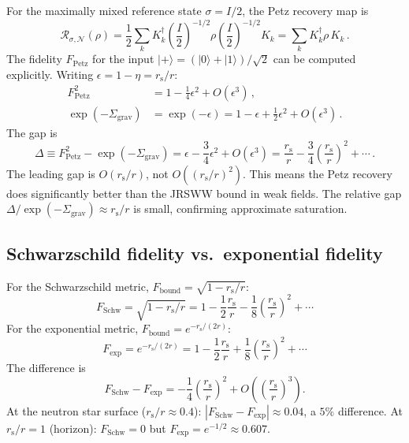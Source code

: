 \documentclass[aps,prd,preprint,superscriptaddress,longbibliography]{revtex4-2}
\newcommand{\Petz}{\mathcal{R}}
\newcommand{\chan}{\mathcal{N}}
\newcommand{\ket}[1]{|#1\rangle}
\newcommand{\rs}{r_{\mathrm{s}}}
\newcommand{\Sgrav}{\Sigma_{\mathrm{grav}}}
\newcommand{\Fbound}{F_{\mathrm{bound}}}
\begin{document}
For the maximally mixed reference state $\sigma = I/2$, the Petz
recovery map is
\begin{equation}
  \Petz_{\sigma,\chan}(\rho) = \frac{1}{2}\sum_k K_k^\dagger
  \left(\frac{I}{2}\right)^{-1/2}\rho
  \left(\frac{I}{2}\right)^{-1/2} K_k
  = \sum_k K_k^\dagger \rho\, K_k\,.
  \label{eq:Petz_AD}
\end{equation}
The fidelity $F_{\mathrm{Petz}}$ for the input $\ket{+} = (\ket{0}+\ket{1})/\sqrt{2}$
can be computed explicitly.  Writing $\epsilon = 1-\eta = \rs/r$:
\begin{align}
  F_{\mathrm{Petz}}^2 &= 1 - \frac{1}{4}\epsilon^2 + O(\epsilon^3)\,,
  \label{eq:F_Petz_AD}\\
  \exp(-\Sgrav) &= \exp(-\epsilon) = 1 - \epsilon + \frac{1}{2}\epsilon^2 + O(\epsilon^3)\,.
  \label{eq:exp_Sgrav}
\end{align}
The gap is
\begin{equation}
  \boxed{\Delta \equiv F_{\mathrm{Petz}}^2 - \exp(-\Sgrav)
  = \epsilon - \frac{3}{4}\epsilon^2 + O(\epsilon^3)
  = \frac{\rs}{r} - \frac{3}{4}\left(\frac{\rs}{r}\right)^2 + \cdots\,.}
  \label{eq:gap}
\end{equation}
The leading gap is $O(\rs/r)$, not $O((\rs/r)^2)$.  This means the
Petz recovery does significantly better than the JRSWW bound in weak
fields.  The relative gap
$\Delta/\exp(-\Sgrav) \approx \rs/r$ is small, confirming
approximate saturation.

\subsection{Schwarzschild fidelity vs.\ exponential fidelity}

For the Schwarzschild metric, $\Fbound = \sqrt{1-\rs/r}$:
\begin{equation}
  F_{\mathrm{Schw}} = \sqrt{1-\rs/r}
  = 1 - \frac{1}{2}\frac{\rs}{r} - \frac{1}{8}\left(\frac{\rs}{r}\right)^2 + \cdots
  \label{eq:F_Schw}
\end{equation}
For the exponential metric, $\Fbound = e^{-\rs/(2r)}$:
\begin{equation}
  F_{\mathrm{exp}} = e^{-\rs/(2r)}
  = 1 - \frac{1}{2}\frac{\rs}{r} + \frac{1}{8}\left(\frac{\rs}{r}\right)^2 + \cdots
  \label{eq:F_exp}
\end{equation}
The difference is
\begin{equation}
  F_{\mathrm{Schw}} - F_{\mathrm{exp}}
  = -\frac{1}{4}\left(\frac{\rs}{r}\right)^2 + O\!\left(\left(\frac{\rs}{r}\right)^3\right).
  \label{eq:F_diff}
\end{equation}
At the neutron star surface ($\rs/r \approx 0.4$):
$|F_{\mathrm{Schw}} - F_{\mathrm{exp}}| \approx 0.04$, a $5\%$
difference.  At $\rs/r = 1$ (horizon):
$F_{\mathrm{Schw}} = 0$ but $F_{\mathrm{exp}} = e^{-1/2} \approx 0.607$.
\end{document}
